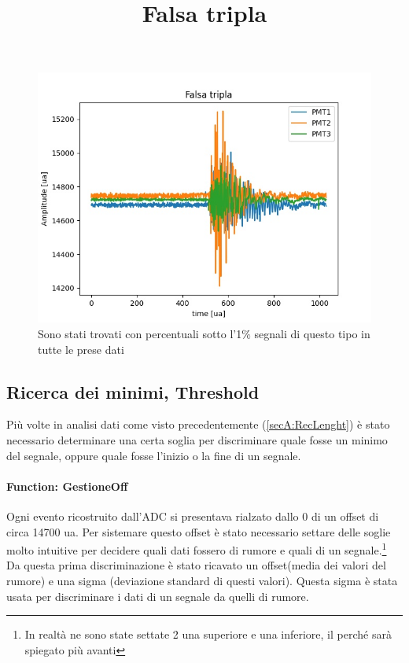 \documentclass[a4paper]{article}
\begin{document}
\begin{figure}[H]
\centering
\title{Falsa tripla}
\begin{center}
\includegraphics[scale=0.4]{./immagini/TimeOfFlight/FalsaTripla.jpg}
\caption{Sono stati trovati con percentuali sotto l'1$\%$ segnali di questo tipo in tutte le prese dati}
\label{fig:FalsaTripla}
\end{center}
\end{figure}

\subsection{Ricerca dei minimi, Threshold}
\label{secA:Threshold}
Più volte in analisi dati come visto precedentemente (\ref{secA:RecLenght}) è stato necessario determinare una certa soglia per discriminare quale fosse un minimo del segnale, oppure quale fosse l'inizio o la fine di un segnale.
\paragraph{Function: GestioneOff}
Ogni evento ricostruito dall'ADC si presentava rialzato dallo 0 di un offset di circa 14700 ua. Per sistemare questo offset è stato necessario settare delle soglie molto intuitive per decidere quali dati fossero di rumore e quali di un segnale.\footnote{In realtà ne sono state settate 2 una superiore e una inferiore, il perché sarà spiegato più avanti} Da questa prima discriminazione è stato ricavato un offset(media dei valori del rumore) e una sigma (deviazione standard di questi valori). Questa sigma è stata usata per discriminare i dati di un segnale da quelli di rumore.
\end{document}
